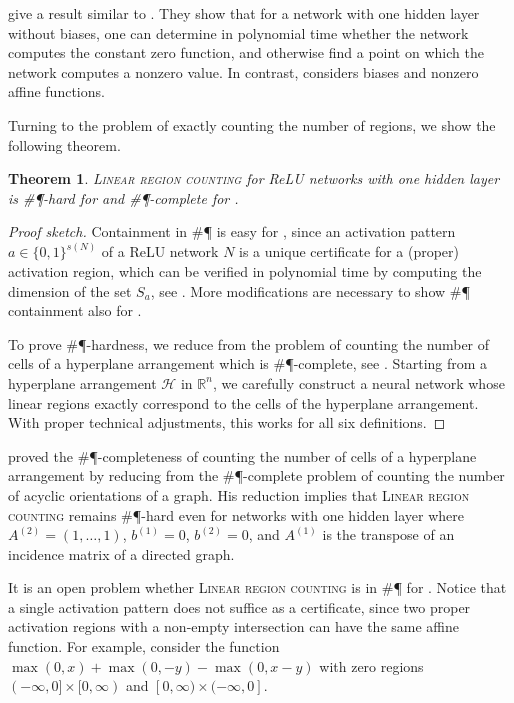 \documentclass{article}
\newtheorem{theorem}{Theorem}[section]
\begin{document}
\citet[Lemma 15]{froese2024complexity} give a result similar to .
They show that for a network with one hidden layer without biases, one can determine in polynomial time whether the network computes the constant zero function, and otherwise find a point on which the network computes a nonzero value.
In contrast,  considers biases and nonzero affine functions.

Turning to the problem of exactly counting the number of regions, we show the following theorem.
\begin{theorem}
\label{thm:linear_region_counting_is_sharp_p_complete_for_one_hidden_layer}
    \textsc{Linear region counting} for ReLU networks with one hidden layer is \#\P-hard for  and \#\P-complete for .
\end{theorem}
\begin{proof}[Proof sketch]
Containment in \#\P{} is easy for , since an activation pattern $a\in \{0,1\}^{s(N)}$ of a ReLU network $N$ is a unique certificate for a (proper) activation region, which can be verified in polynomial time by computing the dimension of the set $S_a$, see .
More modifications are necessary to show \#\P{} containment also for .

To prove \#\P-hardness, we reduce from the problem of counting the number of cells of a hyperplane arrangement which is \#\P-complete, see \citep{linial1986hard}.
Starting from a hyperplane arrangement $\mathcal{H}$ in $\mathbb{R}^n$, we carefully construct a neural network whose linear regions exactly correspond to the cells of the hyperplane arrangement. With proper technical adjustments, this works for all six definitions.
\end{proof} 
\citet{linial1986hard} proved the \#\P-completeness of counting the number of cells of a hyperplane arrangement by reducing from the \#\P-complete problem of counting the number of acyclic orientations of a graph.
His reduction implies that \textsc{Linear region counting} remains \#\P-hard even for networks with one hidden layer where $A^{(2)}=(1,\dots,1)$, $b^{(1)}=0$, $b^{(2)}=0$, and $A^{(1)}$ is the transpose of an incidence matrix of a directed graph.

It is an open problem whether \textsc{Linear region counting} is in \#\P{} for .
Notice that a single activation pattern does not suffice as a certificate, since two proper activation regions with a non-empty intersection can have the same affine function.
For example, consider the function $\max(0,x)+\max(0,-y)-\max(0,x-y)$ with zero regions $(-\infty, 0]\times [0,\infty)$ and $[0,\infty) \times (-\infty, 0]$.
\end{document}
